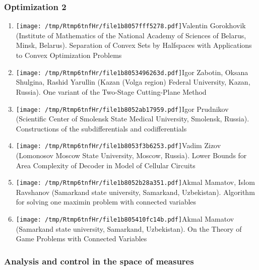 \documentclass[
]{article}
\providecommand{\tightlist}{%
  \setlength{\itemsep}{0pt}\setlength{\parskip}{0pt}}
\begin{document}
\hypertarget{o2}{%
\subsubsection{Optimization 2}\label{o2}}

\begin{enumerate}
\def\labelenumi{\arabic{enumi}.}
\tightlist
\item
  \protect\texttt{[image: /tmp/Rtmp6tnfHr/file1b8057fff5278.pdf]}Valentin
  Gorokhovik (Institute of Mathematics of the National Academy of
  Sciences of Belarus, Minsk, Belarus). Separation of Convex Sets by
  Halfspaces with Applications to Convex Optimization Problems
\item
  \protect\texttt{[image: /tmp/Rtmp6tnfHr/file1b8053496263d.pdf]}Igor
  Zabotin, Oksana Shulgina, Rashid Yarullin (Kazan (Volga region)
  Federal University, Kazan, Russia). One variant of the Two-Stage
  Cutting-Plane Method
\item
  \protect\texttt{[image: /tmp/Rtmp6tnfHr/file1b8052ab17959.pdf]}Igor
  Prudnikov (Scientific Center of Smolensk State Medical University,
  Smolensk, Russia). Constructions of the subdifferentials and
  codifferentials
\item
  \protect\texttt{[image: /tmp/Rtmp6tnfHr/file1b8053f3b6253.pdf]}Vadim
  Zizov (Lomonosov Moscow State University, Moscow, Russia). Lower
  Bounds for Area Complexity of Decoder in Model of Cellular Circuits
\item
  \protect\texttt{[image: /tmp/Rtmp6tnfHr/file1b8052b28a351.pdf]}Akmal
  Mamatov, Islom Ravshanov (Samarkand state university, Samarkand,
  Uzbekistan). Algorithm for solving one maximin problem with connected
  variables
\item
  \protect\texttt{[image: /tmp/Rtmp6tnfHr/file1b805410fc14b.pdf]}Akmal
  Mamatov (Samarkand state university, Samarkand, Uzbekistan). On the
  Theory of Game Problems with Connected Variables
\end{enumerate}

\hypertarget{meas}{%
\subsubsection{Analysis and control in the space of
measures}\label{meas}}
\end{document}
